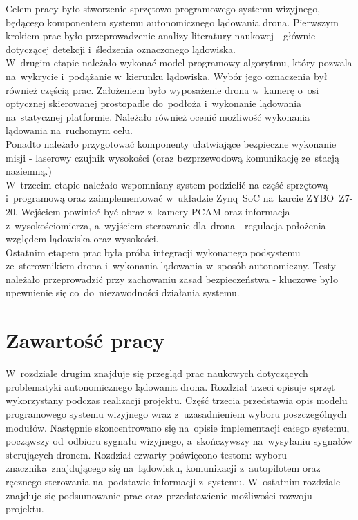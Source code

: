 Celem pracy było stworzenie sprzętowo-programowego systemu wizyjnego, będącego komponentem systemu autonomicznego lądowania drona. Pierwszym krokiem prac było przeprowadzenie analizy literatury naukowej - głównie dotyczącej detekcji i~śledzenia oznaczonego lądowiska. \\
W~drugim etapie należało wykonać model programowy algorytmu, który pozwala na~wykrycie i~podążanie w~kierunku lądowiska. Wybór jego oznaczenia był również częścią prac. Założeniem było wyposażenie drona w~kamerę o~osi optycznej skierowanej prostopadle do~podłoża i~wykonanie lądowania na~statycznej platformie. Należało również ocenić możliwość wykonania lądowania na~ruchomym celu.\\
Ponadto należało przygotować komponenty ułatwiające bezpieczne wykonanie misji - laserowy czujnik wysokości (oraz bezprzewodową komunikację ze~stacją naziemną.) \\
W~trzecim etapie należało wspomniany system podzielić na część sprzętową i~programową oraz zaimplementować w~układzie Zynq~SoC na~karcie ZYBO~Z7-20. Wejściem powinieć być obraz z~kamery PCAM oraz informacja z~wysokościomierza, a~wyjściem sterowanie dla~drona - regulacja położenia względem lądowiska oraz wysokości.\\
Ostatnim etapem prac była próba integracji wykonanego podsystemu ze~sterownikiem drona i~wykonania lądowania w~sposób autonomiczny. Testy należało przeprowadzić przy zachowaniu zasad bezpieczeństwa - kluczowe było upewnienie się co~do~niezawodności działania systemu.



\section{Zawartość pracy}
\label{sec:zawartoscPracy}
W~rozdziale drugim znajduje się przegląd prac naukowych dotyczących problematyki autonomicznego lądowania drona. Rozdział trzeci opisuje sprzęt wykorzystany podczas realizacji projektu. Część trzecia przedstawia opis modelu programowego systemu wizyjnego wraz z~uzasadnieniem wyboru poszczególnych modułów. Następnie skoncentrowano się na~opisie implementacji całego systemu, począwszy od~odbioru sygnału wizyjnego, a~skończywszy na~wysyłaniu sygnałów sterujących dronem. Rozdział czwarty poświęcono testom: wyboru znacznika~znajdującego się na~lądowisku, komunikacji z~autopilotem oraz ręcznego sterowania na~podstawie informacji z~systemu. W~ostatnim rozdziale znajduje się podsumowanie prac oraz przedstawienie możliwości rozwoju projektu.

